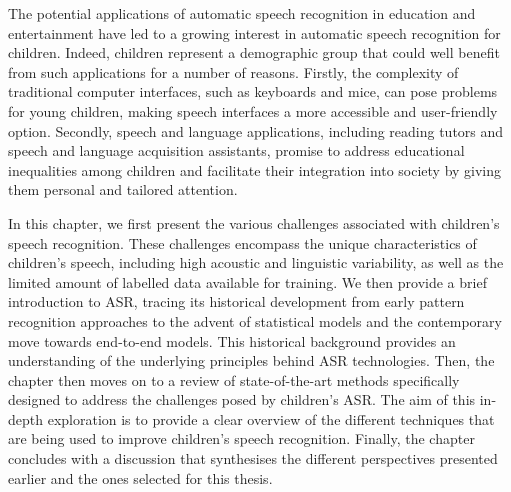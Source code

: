 The potential applications of automatic speech recognition in education and entertainment have led to a growing interest in automatic speech recognition for children. Indeed, children represent a demographic group that could well benefit from such applications for a number of reasons. Firstly, the complexity of traditional computer interfaces, such as keyboards and mice, can pose problems for young children, making speech interfaces a more accessible and user-friendly option. Secondly, speech and language applications, including reading tutors and speech and language acquisition assistants, promise to address educational inequalities among children and facilitate their integration into society by giving them personal and tailored attention.

In this chapter, we first present the various challenges associated with children's speech recognition. These challenges encompass the unique characteristics of children's speech, including high acoustic and linguistic variability, as well as the limited amount of labelled data available for training. We then provide a brief introduction to ASR, tracing its historical development from early pattern recognition approaches to the advent of statistical models and the contemporary move towards end-to-end models. This historical background provides an understanding of the underlying principles behind ASR technologies. Then, the chapter then moves on to a review of state-of-the-art methods specifically designed to address the challenges posed by children's ASR.  The aim of this in-depth exploration is to provide a clear overview of the different techniques that are being used to improve children's speech recognition. Finally, the chapter concludes with a discussion that synthesises the different perspectives presented earlier and the ones selected for this thesis.

